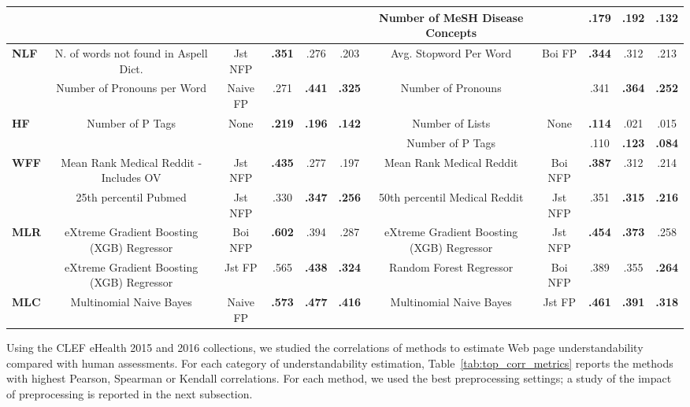 \documentclass[10pt,a4paper]{article}
\begin{document}
\begin{table}[t]
{\begin{tabular}{l|ccccc||ccccc}
			&  &  &  &  &  & Number of MeSH Disease Concepts  &  & .179  & \textbf{.192}  & \textbf{.132}\tabularnewline
			\midrule 
			\multirow{2}{*}{\textbf{NLF}} & N. of words not found in Aspell Dict.  & Jst NFP  & \textbf{.351}  & .276  & .203 & Avg. Stopword Per Word  & \multirow{2}{*}{Boi FP } & \textbf{.344}  & .312  & .213\tabularnewline
			& Number of Pronouns per Word  & Naive FP  & .271  & \textbf{.441}  & \textbf{.325} & Number of Pronouns  &  & .341  & \textbf{.364}  & \textbf{.252}\tabularnewline
			\midrule 
			\multirow{2}{*}{\textbf{HF}} & \multirow{2}{*}{Number of P Tags } & \multirow{2}{*}{None } & \multirow{2}{*}{\textbf{.219} } & \multirow{2}{*}{\textbf{.196} } & \multirow{2}{*}{\textbf{.142}} & Number of Lists  & \multirow{2}{*}{None} & \textbf{.114}  & .021  & .015\tabularnewline
			&  &  &  &  &  & Number of P Tags  &  & .110  & \textbf{.123}  & \textbf{.084}\tabularnewline
			\midrule 
            \multirow{2}{*}{\textbf{WFF}} & Mean Rank Medical Reddit - Includes OV  & Jst NFP  & \textbf{.435}  & .277  & .197 & Mean Rank Medical Reddit  & Boi NFP  & \textbf{.387}  & .312  & .214\tabularnewline
			& 25th percentil Pubmed  & Jst NFP  & .330  & \textbf{.347}  & \textbf{.256} & 50th percentil Medical Reddit  & Jst NFP  & .351  & \textbf{.315}  & \textbf{.216}\tabularnewline
			\midrule 
			\multirow{2}{*}{\textbf{MLR}} & eXtreme Gradient Boosting (XGB) Regressor  & Boi NFP  & \textbf{.602}  & .394  & .287 & eXtreme Gradient Boosting (XGB) Regressor  & Jst NFP  & \textbf{.454}  & \textbf{.373}  & .258\tabularnewline
			& eXtreme Gradient Boosting (XGB) Regressor  & Jst FP  & .565  & \textbf{.438}  & \textbf{.324} & Random Forest Regressor  & Boi NFP  & .389  & .355  & \textbf{.264}\tabularnewline
			\midrule 
			\textbf{MLC} & Multinomial Naive Bayes  & Naive FP  & \textbf{.573}  & \textbf{.477}  & \textbf{.416} & Multinomial Naive Bayes  & Jst FP  & \textbf{.461}  & \textbf{.391}  & \textbf{.318}\tabularnewline
			\bottomrule
		\end{tabular}
	} %
\end{table}


Using the CLEF eHealth 2015 and 2016 collections, we studied the correlations of methods to estimate Web page understandability compared with human assessments. For each category of understandability estimation, Table~\ref{tab:top_corr_metrics} reports the methods with highest Pearson, Spearman or Kendall correlations. For each method, we used the best preprocessing settings; a study of the impact of preprocessing is reported in the next subsection.
\end{document}
